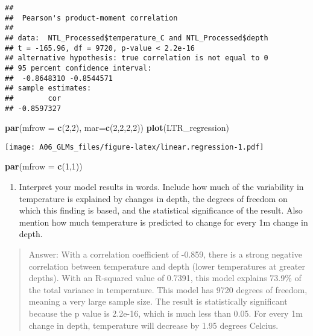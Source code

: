 \documentclass[
]{article}
\newenvironment{Shaded}{\begin{snugshade}}{\end{snugshade}}
\newcommand{\DataTypeTok}[1]{\textcolor[rgb]{0.13,0.29,0.53}{#1}}
\newcommand{\DecValTok}[1]{\textcolor[rgb]{0.00,0.00,0.81}{#1}}
\newcommand{\KeywordTok}[1]{\textcolor[rgb]{0.13,0.29,0.53}{\textbf{#1}}}
\newcommand{\NormalTok}[1]{#1}
\providecommand{\tightlist}{%
  \setlength{\itemsep}{0pt}\setlength{\parskip}{0pt}}
\begin{document}
\begin{verbatim}
## 
##  Pearson's product-moment correlation
## 
## data:  NTL_Processed$temperature_C and NTL_Processed$depth
## t = -165.96, df = 9720, p-value < 2.2e-16
## alternative hypothesis: true correlation is not equal to 0
## 95 percent confidence interval:
##  -0.8648310 -0.8544571
## sample estimates:
##        cor 
## -0.8597327
\end{verbatim}

\begin{Shaded}
\begin{Highlighting}[]
\KeywordTok{par}\NormalTok{(}\DataTypeTok{mfrow =} \KeywordTok{c}\NormalTok{(}\DecValTok{2}\NormalTok{,}\DecValTok{2}\NormalTok{), }\DataTypeTok{mar=}\KeywordTok{c}\NormalTok{(}\DecValTok{2}\NormalTok{,}\DecValTok{2}\NormalTok{,}\DecValTok{2}\NormalTok{,}\DecValTok{2}\NormalTok{))}
\KeywordTok{plot}\NormalTok{(LTR_regression)}
\end{Highlighting}
\end{Shaded}

\texttt{[image: A06\_GLMs\_files/figure-latex/linear.regression-1.pdf]}

\begin{Shaded}
\begin{Highlighting}[]
\KeywordTok{par}\NormalTok{(}\DataTypeTok{mfrow =} \KeywordTok{c}\NormalTok{(}\DecValTok{1}\NormalTok{,}\DecValTok{1}\NormalTok{))}
\end{Highlighting}
\end{Shaded}

\begin{enumerate}
\def\labelenumi{\arabic{enumi}.}
\setcounter{enumi}{7}
\tightlist
\item
  Interpret your model results in words. Include how much of the
  variability in temperature is explained by changes in depth, the
  degrees of freedom on which this finding is based, and the statistical
  significance of the result. Also mention how much temperature is
  predicted to change for every 1m change in depth.
\end{enumerate}

\begin{quote}
Answer: With a correlation coefficient of -0.859, there is a strong
negative correlation between temperature and depth (lower temperatures
at greater depths). With an R-squared value of 0.7391, this model
explains 73.9\% of the total variance in temperature. This model has
9720 degrees of freedom, meaning a very large sample size. The result is
statistically significant because the p value is 2.2e-16, which is much
less than 0.05. For every 1m change in depth, temperature will decrease
by 1.95 degrees Celcius.
\end{quote}
\end{document}
